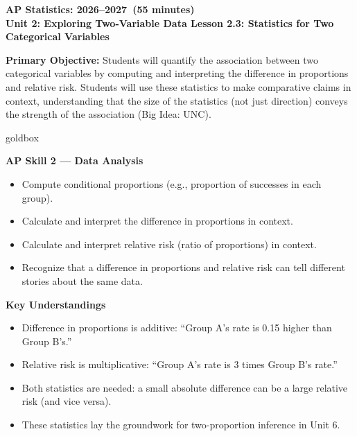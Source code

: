 \documentclass[10pt]{article}
\newcommand{\CourseName}{AP Statistics}
\newcommand{\SchoolYear}{2026--2027}
\newcommand{\MeetingLength}{55 minutes}
\newcommand{\UnitNumberName}{Unit 2: Exploring Two-Variable Data \quad}
\newcommand{\LessonNumberName}{Lesson 2.3: Statistics for Two Categorical Variables}
\begin{document}
\begin{center}
    {\Large\bfseries \CourseName: \SchoolYear\ (\MeetingLength) \\
    {\small\bfseries \UnitNumberName \LessonNumberName}}
\end{center}

\begin{tcolorbox}[colback=sky,colframe=navy,boxrule=0.9pt,arc=2mm,
    left=2mm,right=2mm,top=1.5mm,bottom=1.5mm]
    \textbf{Primary Objective:} Students will quantify the association between two categorical
    variables by computing and interpreting the difference in proportions and relative risk.
    Students will use these statistics to make comparative claims in context, understanding that
    the size of the statistics (not just direction) conveys the strength of the association (Big Idea: UNC).
\end{tcolorbox}

\begin{skillbox}{goldbox}
\begin{minipage}[t]{0.48\linewidth}
    \textbf{AP Skill 2 --- Data Analysis}
    \begin{itemize}
        \item Compute conditional proportions (e.g., proportion of successes in each group).
        \item Calculate and interpret the difference in proportions in context.
        \item Calculate and interpret relative risk (ratio of proportions) in context.
        \item Recognize that a difference in proportions and relative risk can tell different stories about the same data.
    \end{itemize}
\end{minipage}
\hfill
\begin{minipage}[t]{0.48\linewidth}
    \textbf{Key Understandings}
    \begin{itemize}
        \item Difference in proportions is additive: ``Group A's rate is 0.15 higher than Group B's.''
        \item Relative risk is multiplicative: ``Group A's rate is 3 times Group B's rate.''
        \item Both statistics are needed: a small absolute difference can be a large relative risk (and vice versa).
        \item These statistics lay the groundwork for two-proportion inference in Unit 6.
    \end{itemize}
\end{minipage}
\end{skillbox}
\end{document}
